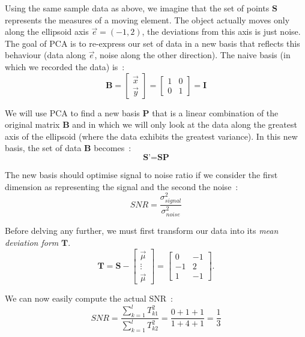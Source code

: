 \documentclass[11pt,twocolumn]{amsart} %
\begin{document}
Using the same sample data as above, we imagine that the set of points $\textbf{S}$ represents the measures of a moving element. The object actually moves only along the ellipsoid axis $\vec{e} = (-1,2)$, the deviations from this axis is just noise. The goal of PCA is to re-express our set of data in a new basis that reflects this behaviour (data along $\vec{e}$, noise along the other direction). The naive basis (in which we recorded the data) is~:
\begin{equation*}
  \textbf{B} = \begin{bmatrix} \vec{x} \\ \vec{y} \end{bmatrix} = \begin{bmatrix} 1 & 0 \\ 0 & 1 \end{bmatrix} = \textbf{I}
\end{equation*}

We will use PCA to find a new basis $\textbf{P}$ that is a linear combination of the original matrix $\textbf{B}$ and in which we will only look at the data along the greatest axis of the ellipsoid (where the data exhibits the greatest variance). In this new basis, the set of data \textbf{B} becomes~:
\begin{equation*}
  \textbf{S'} = \textbf{S}\textbf{P}
\end{equation*}

The new basis should optimise signal to noise ratio if we consider the first dimension as representing the signal and the second the noise~:
\begin{equation*}
  SNR = \frac{\sigma_{signal}^2}{\sigma_{noise}^2}
\end{equation*}

Before delving any further, we must first transform our data into its \emph{mean deviation form} $\textbf{T}$. 
\begin{equation*}
  \textbf{T} = \textbf{S} - \begin{bmatrix}\vec{\mu} \\ \vdots \\ \vec{\mu}\end{bmatrix} = \begin{bmatrix} 0 & -1 \\ -1 & 2 \\ 1 & -1\end{bmatrix}.
\end{equation*}

We can now easily compute the actual SNR~:
\begin{equation*}
  SNR = \frac{\sum_{k=1}^l T_{k1}^2}{\sum_{k=1}^l T_{k2}^2} = \frac{0+1+1}{1+4+1} = \frac{1}{3}
\end{equation*}
\end{document}

